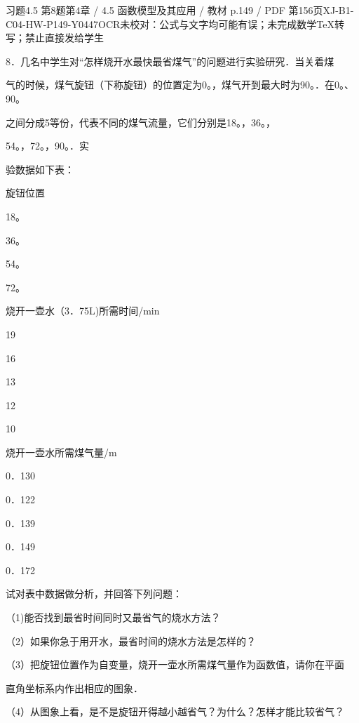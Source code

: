 \begin{bankitem}{习题4.5 第8题}{第4章 / 4.5 函数模型及其应用 / 教材 p.149 / PDF 第156页}{XJ-B1-C04-HW-P149-Y0447}{OCR未校对：公式与文字均可能有误；未完成数学TeX转写；禁止直接发给学生}
\begin{ocrdraft}
\par
8．几名中学生对“怎样烧开水最快最省煤气”的问题进行实验研究．当关着煤
\par
气的时候，煤气旋钮（下称旋钮）的位置定为0。，煤气开到最大时为90。．在0。、90。
\par
之间分成5等份，代表不同的煤气流量，它们分别是18。，36。，
\par
54。，72。，90。．实
\par
验数据如下表：
\par
旋钮位置
\par
18。
\par
36。
\par
54。
\par
72。
\par
烧开一壶水（3．75L)所需时间/min
\par
19
\par
16
\par
13
\par
12
\par
10
\par
烧开一壶水所需煤气量/m
\par
0．130
\par
0．122
\par
0．139
\par
0．149
\par
0．172
\par
试对表中数据做分析，并回答下列问题：
\par
（1)能否找到最省时间同时又最省气的烧水方法？
\par
（2）如果你急于用开水，最省时间的烧水方法是怎样的？
\par
（3）把旋钮位置作为自变量，烧开一壶水所需煤气量作为函数值，请你在平面
\par
直角坐标系内作出相应的图象．
\par
（4）从图象上看，是不是旋钮开得越小越省气？为什么？怎样才能比较省气？
\end{ocrdraft}
\end{bankitem}
